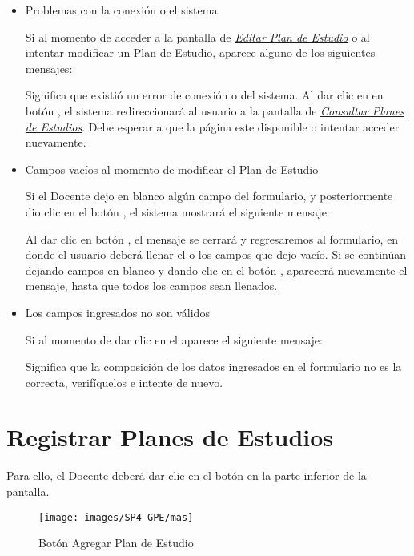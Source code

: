 \begin{itemize}
	\item Problemas con la conexión o el sistema

	Si al momento de acceder a la pantalla de \hyperlink{editarPE}{\textit{Editar Plan de Estudio}} o al intentar modificar un Plan de Estudio, aparece alguno de los siguientes mensajes:


	Significa que existió un error de conexión o del sistema. Al dar clic en en botón  , el sistema redireccionará al usuario a la pantalla de \hyperlink{consultarPE}{\textit{Consultar Planes de Estudios}}. Debe esperar a que la página este disponible o intentar acceder nuevamente.

	\item Campos vacíos al momento de modificar el Plan de Estudio

	Si el Docente dejo en blanco algún campo del formulario, y posteriormente dio clic en el botón  , el sistema mostrará el siguiente mensaje:


	Al dar clic en botón  , el mensaje se cerrará y regresaremos al formulario, en donde el usuario deberá llenar el o los campos que dejo vacío. Si se continúan dejando campos en blanco y dando clic en el botón  , aparecerá nuevamente el mensaje, hasta que todos los campos sean llenados.

	\item Los campos ingresados no son válidos

	Si al momento de dar clic en el  aparece el siguiente mensaje:

	Significa que la composición de los datos ingresados en el formulario no es la correcta, verifíquelos e intente de nuevo.

\end{itemize}
\newpage
\section{Registrar Planes de Estudios}

Para ello, el Docente deberá dar clic en el botón \IUbutton{+} en la parte inferior de la pantalla.

\begin{figure}[!hbtp]
    \centering
    \hypertarget{add}{\texttt{[image: images/SP4-GPE/mas]}}
    \caption{Botón Agregar Plan de Estudio}
    \label{add}
\end{figure}

